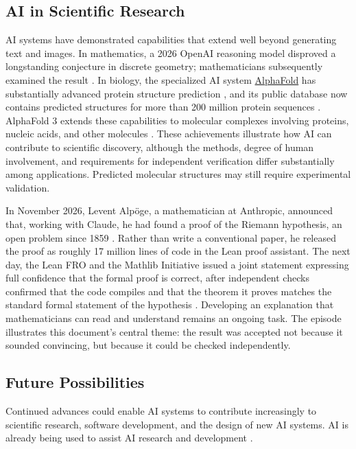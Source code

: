 \documentclass[11pt]{article}
\begin{document}
%

\FloatBarrier
\subsection{AI in Scientific Research}

AI systems have demonstrated capabilities that extend well beyond generating text and images. In mathematics, a 2026 OpenAI reasoning model disproved a longstanding conjecture in discrete geometry; mathematicians subsequently examined the result \citep{OpenAI2026Geometry}.
In biology, the specialized AI system \href{https://alphafold.com/}{AlphaFold} has substantially advanced protein structure prediction \citep{Jumper2021AlphaFold}, and its public database now contains predicted structures for more than 200 million protein sequences \citep{Varadi2024AlphaFoldDB}. AlphaFold 3 extends these capabilities to molecular complexes involving proteins, nucleic acids, and other molecules \citep{Abramson2024AlphaFold3}. These achievements illustrate how AI can contribute to scientific discovery, although the methods, degree of human involvement, and requirements for independent verification differ substantially among applications. Predicted molecular structures may still require experimental validation.

In November 2026, Levent Alpöge, a mathematician at Anthropic,
announced that, working with Claude, he had found a proof of the
Riemann hypothesis, an open problem since 1859
\citep{Alpoge2026RH}. Rather than write a conventional paper, he
released the proof as roughly 17 million lines of code in the
Lean proof assistant. The next day, the Lean FRO and the Mathlib
Initiative issued a joint statement expressing full confidence
that the formal proof is correct, after independent checks
confirmed that the code compiles and that the theorem it proves
matches the standard formal statement of the hypothesis
\citep{LeanFRO2026RH}. Developing an explanation that
mathematicians can read and understand remains an ongoing task.
The episode illustrates this document's central theme: the result
was accepted not because it sounded convincing, but because it
could be checked independently.

\subsection{Future Possibilities}

Continued advances could enable AI systems to contribute increasingly to scientific research, software development, and the design of new AI systems. AI is already being used to assist AI research and development \citep{Anthropic2026RSI}.
\end{document}
